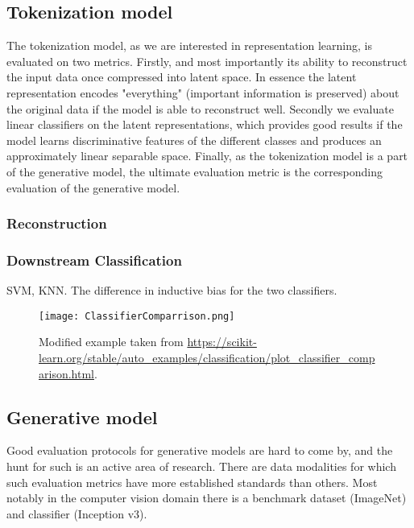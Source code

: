 \documentclass[../../thesis.tex]{subfiles}
\begin{document}
\subsection{Tokenization model}

The tokenization model, as we are interested in representation learning, is evaluated on two metrics. Firstly, and most importantly its ability to reconstruct the input data once compressed into latent space. In essence the latent representation encodes "everything" (important information is preserved) about the original data if the model is able to reconstruct well. Secondly we evaluate linear classifiers on the latent representations, which provides good results if the model learns discriminative features of the different classes and produces an approximately linear separable space. Finally, as the tokenization model is a part of the generative model, the ultimate evaluation metric is the corresponding evaluation of the generative model. 

\subsubsection{Reconstruction}


\subsubsection{Downstream Classification}

SVM, KNN. The difference in inductive bias for the two classifiers. 


\begin{figure}[h]
    \label{fig:ClassifierComparrison}
    \texttt{[image: ClassifierComparrison.png]}
    \centering
    \caption{Modified example taken from \url{https://scikit-learn.org/stable/auto_examples/classification/plot_classifier_comparison.html}.}
\end{figure}

\subsection{Generative model}
Good evaluation protocols for generative models are hard to come by, and the hunt for such is an active area of research. There are data modalities for which such evaluation metrics have more established standards than others. Most notably in the computer vision domain there is a benchmark dataset (ImageNet) and classifier (Inception v3). \newline
\end{document}
